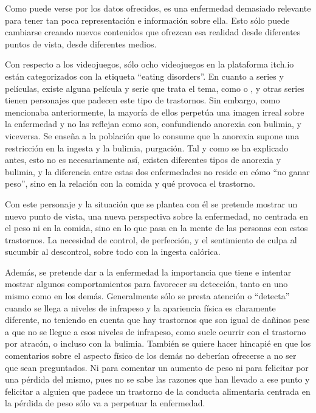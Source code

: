\documentclass[12pt, a4paper,twoside,titlepage]{book}
\begin{document}
\begin{itemize}
{    Como puede verse por los datos ofrecidos, es una enfermedad demasiado relevante para tener tan poca representación e información sobre ella. Esto sólo puede cambiarse creando nuevos contenidos que ofrezcan esa realidad desde diferentes puntos de vista, desde diferentes medios. 
    
    Con respecto a los videojuegos, sólo ocho videojuegos en la plataforma itch.io están categorizados con la etiqueta “eating disorders”. En cuanto a series y películas, existe alguna película y serie que trata el tema, como  o , y otras series tienen personajes que padecen este tipo de trastornos. Sin embargo, como mencionaba anteriormente, la mayoría de ellos perpetúa una imagen irreal sobre la enfermedad y no las reflejan como son, confundiendo anorexia con bulimia, y viceversa. Se enseña a la población que lo consume que la anorexia supone una restricción en la ingesta y la bulimia, purgación. Tal y como se ha explicado antes, esto no es necesariamente así, existen diferentes tipos de anorexia y bulimia, y la diferencia entre estas dos enfermedades no reside en cómo “no ganar peso”, sino en la relación con la comida y qué provoca el trastorno. 
    
    Con este personaje y la situación que se plantea con él se pretende mostrar un nuevo punto de vista, una nueva perspectiva sobre la enfermedad, no centrada en el peso ni en la comida, sino en lo que pasa en la mente de las personas con estos trastornos. La necesidad de control, de perfección, y el sentimiento de culpa al sucumbir al descontrol, sobre todo con la ingesta calórica. 
    
    Además, se pretende dar a la enfermedad la importancia que tiene e intentar mostrar algunos comportamientos para favorecer su detección, tanto en uno mismo como en los demás. Generalmente sólo se presta atención o “detecta” cuando se llega a niveles de infrapeso y la apariencia física es claramente diferente, no teniendo en cuenta que hay trastornos que son igual de dañinos pese a que no se llegue a esos niveles de infrapeso, como suele ocurrir con el trastorno por atracón, o incluso con la bulimia. También se quiere hacer hincapié en que los comentarios sobre el aspecto físico de los demás no deberían ofrecerse a no ser que sean preguntados. Ni para comentar un aumento de peso ni para felicitar por una pérdida del mismo, pues no se sabe las razones que han llevado a ese punto y felicitar a alguien que padece un trastorno de la conducta alimentaria centrada en la pérdida de peso sólo va a perpetuar la enfermedad. }

\end{itemize}
\end{document}
